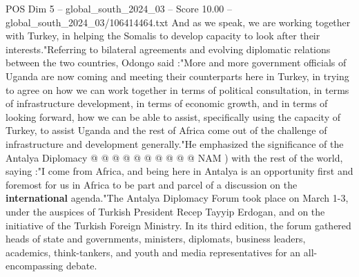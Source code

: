 \begin{textsample}{POS Dim 5 – global\_south\_2024\_03 – Score 10.00 – global\_south\_2024\_03/106414464.txt}
And as we speak, we are working together with Turkey, in helping the Somalis to develop capacity to look after their interests."Referring to bilateral agreements and evolving diplomatic relations between the two countries, Odongo said :"More and more government officials of Uganda are now coming and meeting their counterparts here in Turkey, in trying to agree on how we can work together in terms of political consultation, in terms of infrastructure development, in terms of economic growth, and in terms of looking forward, how we can be able to assist, specifically using the capacity of Turkey, to assist Uganda and the rest of Africa come out of the challenge of infrastructure and development generally."He emphasized the significance of the Antalya Diplomacy @ @ @ @ @ @ @ @ @ @ NAM ) with the rest of the world, saying :"I come from Africa, and being here in Antalya is an opportunity first and foremost for us in Africa to be part and parcel of a discussion on the \textbf{international} agenda."The Antalya Diplomacy Forum took place on March 1-3, under the auspices of Turkish President Recep Tayyip Erdogan, and on the initiative of the Turkish Foreign Ministry.
In its third edition, the forum gathered heads of state and governments, ministers, diplomats, business leaders, academics, think-tankers, and youth and media representatives for an all-encompassing debate.

\end{textsample}
